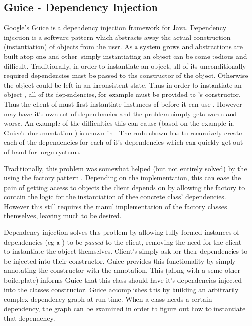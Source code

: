 \subsection{Guice - Dependency Injection}
Google's Guice \cite{guice} is a dependency injection framework for Java. Dependency injection is a software pattern which abstracts away the actual construction (instantiation) of objects from the user. As a system grows and abstractions are built atop one and other, simply instantiating an object can be come tedious and difficult. Traditionally, in order to instantiate an object, all of its unconditionally required dependencies must be passed to the constructor of the object. Otherwise the object could be left in an inconsistent state. Thus in order to instantiate an object , all of its dependencies, for example  must be provided to 's constructor. Thus the client of  must first instantiate instances of  before it can use . However  may have it's own set of dependencies and the problem simply gets worse and worse. An example of the difficulties this can cause (based on the example in Guice's documentation \cite{guiceDocs}) is shown in . The code shown has to recursively create each of the dependencies for each of it's dependencies which can quickly get out of hand for large systems.



Traditionally, this problem was somewhat helped (but not entirely solved) by the using the factory pattern \cite{factoryMethodPattern}. Depending on the implementation, this can ease the pain of getting access to objects the client depends on by allowing the factory to contain the logic for the instantiation of thee concrete class' dependencies. However this still requires the manul implementation of the factory classes themselves, leaving much to be desired.


Dependency injection solves this problem by allowing fully formed instances of dependencies (eg a ) to be \textit{passed} to the client, removing the need for the client to instantiate the object themselves. Client's simply ask for their dependencies to be injected into their constructor. Guice provides this functionality by simply annotating the constructor with the  annotation. This (along with a some other boilerplate) informs Guice that this class should have it's dependencies injected into the classes constructor. Guice accomplishes this by building an arbitrarily complex dependency graph at run time. When a class needs a certain dependency, the graph can be examined in order to figure out how to instantiate that dependency. 

